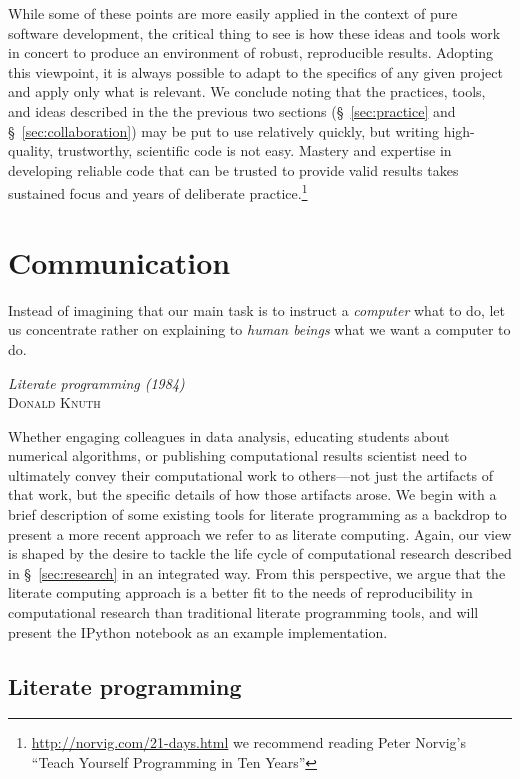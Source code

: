\documentclass[ChapterTOCs,krantz2]{krantz} %
\begin{document}
While some of these points are more easily applied in the context of pure
software development, the critical thing to see is how these ideas and tools
work in concert to produce an environment of robust, reproducible results.
Adopting this viewpoint, it is always possible to adapt to the specifics of any
given project and apply only what is relevant. We conclude noting that the
practices, tools, and ideas described in the the previous two sections
(§~\ref{sec:practice} and §~\ref{sec:collaboration}) may be put to use
relatively quickly, but writing high-quality, trustworthy, scientific code is
not easy. Mastery and expertise in developing reliable code that can be trusted
to provide valid results takes sustained focus and years of deliberate
practice.\footnote{\url{http://norvig.com/21-days.html} we recommend reading
Peter Norvig's ``Teach Yourself Programming in Ten Years''}

\section{\label{sec:communication}Communication}

\setlength{\epigraphrule}{0pt}
\setlength{\epigraphwidth}{.90\textwidth}
\epigraph%
{%
Instead of imagining that our main task is to instruct a \emph{computer}
what to do, let us concentrate rather on explaining to \emph{human beings}
what we want a computer to do.
}%
{\textit{Literate programming (1984)}\\ \textsc{Donald Knuth} }

Whether engaging colleagues in data analysis, educating students about
numerical algorithms, or publishing computational results scientist need to
ultimately convey their computational work to others---not just the artifacts
of that work, but the specific details of how those artifacts arose.  We begin
with a brief description of some existing tools for literate programming as a
backdrop to present a more recent approach we refer to as literate computing.
Again, our view is shaped by the desire to tackle the life cycle of
computational research described in §~\ref{sec:research} in an integrated way.
From this perspective, we argue that the literate computing approach is a
better fit to the needs of reproducibility in computational research than
traditional literate programming tools, and will present the IPython notebook
as an example implementation.

\subsection{Literate programming}
\end{document}
